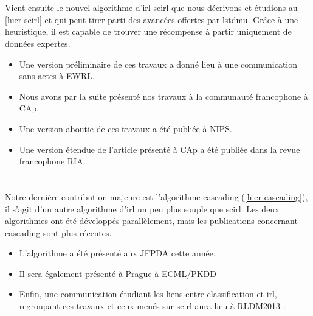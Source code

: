 \documentclass[frenchb,a4paper,justified,notoc]{tufte-book}
\begin{document}
\section{}
\label{sec-10-2}

Vient ensuite le nouvel algorithme d'\gls{irl} \gls{scirl} que nous décrivons et étudions au \autoref{hier-scirl} et qui peut tirer parti des avancées offertes par \gls{lstdmu}. Grâce à une heuristique, il est capable de trouver une récompense à partir uniquement de données expertes.

\begin{itemize}
\item Une version préliminaire de ces travaux a donné lieu à une communication sans actes à EWRL.
\end{itemize}
\begin{itemize}
\item Nous avons par la suite présenté nos travaux à la communauté francophone à CAp.
\end{itemize}
\begin{itemize}
\item Une version aboutie de ces travaux a été publiée à NIPS.
\end{itemize}
\begin{itemize}
\item Une version étendue de l'article présenté à CAp a été publiée dans la revue francophone RIA.
\end{itemize}
\section{}
\label{sec-10-3}


Notre dernière contribution majeure est l'algorithme \gls{cascading} (\autoref{hier-cascading}), il s'agit d'un autre algorithme d'\gls{irl} un peu plus souple que \gls{scirl}. Les deux algorithmes ont été développés parallèlement, mais les publications concernant \gls{cascading} sont plus récentes.
\begin{itemize}
\item L'algorithme a été présenté aux JFPDA cette année.
\end{itemize}
\begin{itemize}
\item Il sera également présenté à Prague à ECML/PKDD
\end{itemize}
\begin{itemize}
\item Enfin, une communication étudiant les liens entre classification et \gls{irl}, regroupant ces travaux et ceux menés sur \gls{scirl} aura lieu à RLDM2013 :
\end{itemize}
\end{document}
